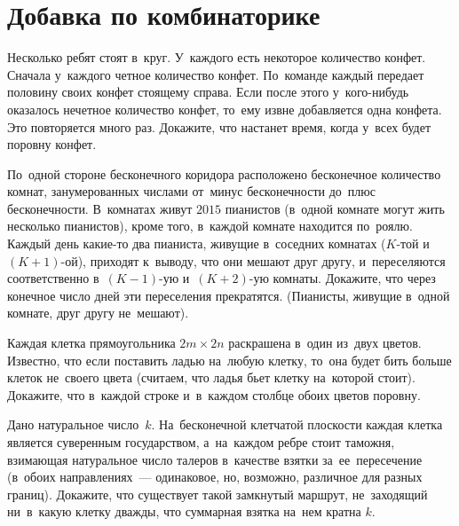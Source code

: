 
\section*{Добавка по комбинаторике}


\begin{problems}

\item
Несколько ребят стоят в~круг.
У~каждого есть некоторое количество конфет.
Сначала у~каждого четное количество конфет.
По~команде каждый передает половину своих конфет стоящему справа.
Если после этого у~кого-нибудь оказалось нечетное количество конфет, то~ему
извне добавляется одна конфета.
Это повторяется много раз.
Докажите, что настанет время, когда у~всех будет поровну конфет.

\item
По~одной стороне бесконечного коридора расположено бесконечное количество
комнат, занумерованных числами от~минус бесконечности до~плюс бесконечности.
В~комнатах живут $2015$ пианистов (в~одной комнате могут жить несколько
пианистов), кроме того, в~каждой комнате находится по~роялю.
Каждый день какие-то два пианиста, живущие в~соседних комнатах
($K$-той и~$(K + 1)$-ой), приходят к~выводу, что они мешают друг другу,
и~переселяются соответственно в~$(K - 1)$-ую и~$(K + 2)$-ую комнаты.
Докажите, что через конечное число дней эти переселения прекратятся.
(Пианисты, живущие в~одной комнате, друг другу не~мешают).

\item
Каждая клетка прямоугольника $2 m \times 2 n$ раскрашена в~один из~двух цветов.
Известно, что если поставить ладью на~любую клетку, то~она будет бить больше
клеток не~своего цвета (считаем, что ладья бьет клетку на~которой стоит).
Докажите, что в~каждой строке и~в~каждом столбце обоих цветов поровну.

\item
Дано натуральное число~$k$.
На~бесконечной клетчатой плоскости каждая клетка является суверенным
государством, а~на~каждом ребре стоит таможня, взимающая натуральное число
талеров в~качестве взятки за~ее~пересечение (в~обоих направлениях~—
одинаковое, но, возможно, различное для разных границ).
Докажите, что существует такой замкнутый маршрут, не~заходящий ни~в~какую
клетку дважды, что суммарная взятка на~нем кратна $k$.

\end{problems}

